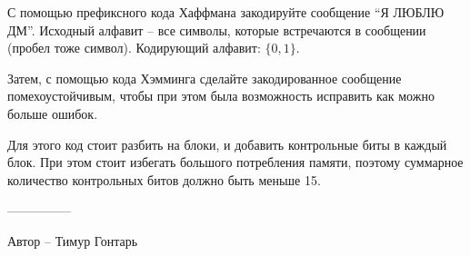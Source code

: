 \question
С помощью префиксного кода Хаффмана закодируйте сообщение “Я ЛЮБЛЮ ДМ”. Исходный алфавит – все символы, которые встречаются в сообщении (пробел тоже символ). Кодирующий алфавит: $\{0, 1\}$.

Затем, с помощью кода Хэмминга сделайте закодированное сообщение помехоустойчивым, чтобы при этом была возможность исправить как можно больше ошибок.

Для этого код стоит разбить на блоки, и добавить контрольные биты в каждый блок. При этом стоит избегать большого потребления памяти, поэтому суммарное количество контрольных битов должно быть меньше 15.

---------------

Автор -- Тимур Гонтарь